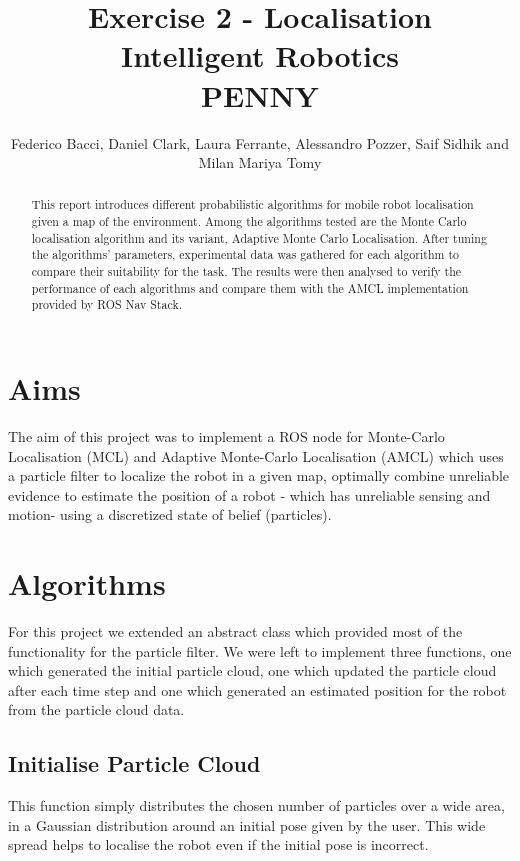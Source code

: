\documentclass[a4paper, 10pt, conference]{ieeeconf}      %
\title{\LARGE \bf
Exercise 2 - Localisation\\
Intelligent Robotics \\
PENNY
}
\author{Federico Bacci, Daniel Clark, Laura Ferrante, Alessandro Pozzer, Saif Sidhik and Milan Mariya Tomy
}
\begin{document}
\maketitle
\thispagestyle{empty}
\pagestyle{empty}


\begin{abstract}

This report introduces different probabilistic algorithms for mobile robot localisation given a map of the environment. Among the algorithms tested are the Monte Carlo localisation algorithm and its variant, Adaptive Monte Carlo Localisation. After tuning the algorithms’ parameters, experimental data was gathered for each algorithm to compare their suitability for the task. The results were then analysed to verify the performance of each algorithms and compare them with the AMCL implementation provided by ROS Nav Stack.
\end{abstract}

\section{Aims}
The aim of this project was to implement a ROS node for Monte-Carlo Localisation (MCL) and Adaptive Monte-Carlo Localisation (AMCL) which uses a particle filter to localize the robot in a given map, optimally combine unreliable evidence to estimate the position of a robot - which has unreliable sensing and motion- using a discretized state of belief (particles). 

\section{Algorithms}
For this project we extended an abstract class which provided most of the functionality for the particle filter. We were left to implement three functions, one which generated the initial particle cloud, one which updated the particle cloud after each time step and one which generated an estimated position for the robot from the particle cloud data.
\subsection{Initialise Particle Cloud}
This function simply distributes the chosen number of particles over a wide area, in a Gaussian distribution around an initial pose given by the user. This wide spread helps to localise the robot even if the initial pose is incorrect.
\end{document}
